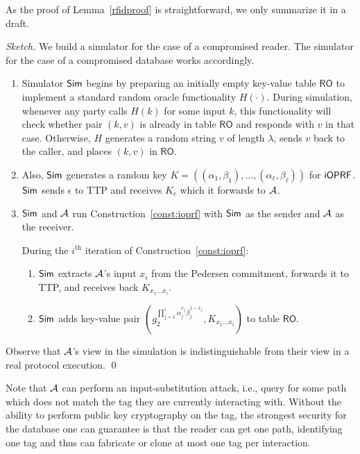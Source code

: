 As the proof of Lemma~\ref{rfidproof} is straightforward, we only
summarize it in a draft.
\begin{proof}[Sketch] We build a simulator for the case of a compromised reader. The simulator for the case of a compromised database works accordingly.
  \begin{enumerate}

  \item Simulator ${\mathsf{Sim}}$ begins by preparing an initially empty
    key-value table $\mathsf{RO}$ to implement a standard random
    oracle functionality $H(\cdot)$. During simulation, whenever any
    party calls $H(k)$ for some input $k$, this functionality will
    check whether pair $(k,v)$ is already in table $\mathsf{RO}$ and
    responds with $v$ in that case. Otherwise, $H$ generates a random
    string $v$ of length $\lambda$, sends $v$ back to the caller, and
    places $(k,v)$ in $\mathsf{RO}$.

  \item Also, ${\mathsf{Sim}}$ generates a random key
    $K=((\alpha_1,\beta_1),\ldots,(\alpha_\ell,\beta_\ell))$ for $\mathsf{i}\mathsf{OPRF}$.
 ${\mathsf{Sim}}$ sends $\epsilon$ to TTP and receives $K_\epsilon$ which it
    forwards to ${\mathcal{A}}$.
    
  \item ${\mathsf{Sim}}$ and ${\mathcal{A}}$ run Construction~\ref{const:ioprf} with ${\mathsf{Sim}}$
    as the sender and ${\mathcal{A}}$ as the receiver.

    During the $i^\text{th}$ iteration of Construction~\ref{const:ioprf}:
    \begin{enumerate}
    \item ${\mathsf{Sim}}$
      extracts ${\mathcal{A}}$'s input $x_i$ from the Pedersen commitment,
      forwards it to TTP, and receives back $K_{x_1\ldots{}x_i}$.

    \item ${\mathsf{Sim}}$ adds key-value pair $(g_2^{ \prod_{j=1}^{i}
      \alpha_j^{x_j}\beta_j^{1-x_j}},K_{x_1\ldots{}x_i})$ to table
      $\mathsf{RO}$.   
    \end{enumerate}
\end{enumerate}
Observe that ${\mathcal{A}}$'s view in the simulation is indistinguishable from their view in a real protocol execution.
\qed\end{proof}
Note that ${\mathcal{A}}$ can perform an input-substitution attack, i.e., query
for some path which does not match the tag they are currently
interacting with. Without the ability to perform public key
cryptography on the tag, the strongest security for the database one
can guarantee is that the reader can get one path, identifying one tag
and thus can fabricate or clone at most one tag per interaction.
